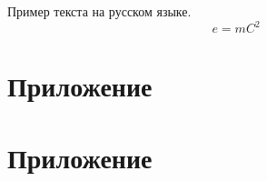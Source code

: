 \documentclass[draft,xelatex]{G7-32-2017}
\begin{document}
Пример текста на русском языке.
\begin{equation}
    \label{ex:eq:1}
    e = mC^2
\end{equation}

\backmatter

\appendix

\chapter{Приложение}

\lipsum[3-5]

\chapter{Приложение}

\lipsum[1-2]




% 

% 





% 


% 


% 
% 
\end{document}
